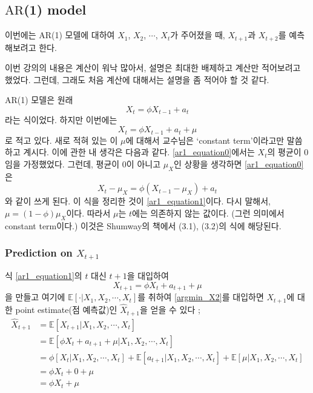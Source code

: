 \documentclass{article}
\newcommand\ar{\ensuremath{\text{AR}}}
\begin{document}
\subsection{\ar(1) model}
이번에는 \ar(1) 모델에 대하여 \(X_1\), \(X_2\), \(\cdots\), \(X_t\)가 주어졌을 때, \(X_{t+1}\)과 \(X_{t+2}\)를 예측해보려고 한다.

이번 강의의 내용은 계산이 워낙 많아서, 설명은 최대한 배제하고 계산만 적어보려고 했었다.
그런데, 그래도 처음 계산에 대해서는 설명을 좀 적어야 할 것 같다.

\ar(1) 모델은 원래
\begin{equation}\label{ar1_equation0}
X_t=\phi X_{t-1}+a_t
\end{equation}
라는 식이었다.
하지만 이번에는
\begin{equation}\label{ar1_equation1}
X_t=\phi X_{t-1}+a_t+\mu
\end{equation}
로 적고 있다.
새로 적혀 있는 이 \(\mu\)에 대해서 교수님은 `constant term'이라고만 말씀하고 계시다.
이에 관한 내 생각은 다음과 같다.
\eqref{ar1_equation0}에서는 \(X_t\)의 평균이 0임을 가정했었다.
그런데, 평균이 0이 아니고 \(\mu_X\)인 상황을 생각하면
\eqref{ar1_equation0}은
\[X_t-\mu_X=\phi(X_{t-1}-\mu_X)+a_t\]
와 같이 쓰게 된다.
이 식을 정리한 것이 \eqref{ar1_equation1}이다.
다시 말해서, \(\mu=(1-\phi)\mu_X\)이다.
따라서 \(\mu\)는 \(t\)에는 의존하지 않는 값이다.
(그런 의미에서 constant term이다.)
이것은 Shumway의 책에서 (3.1), (3.2)의 식에 해당된다.

%
\subsubsection{Prediction on \(X_{t+1}\)}
식 \eqref{ar1_equation1}의 \(t\) 대신 \(t+1\)을 대입하여
\begin{equation}\label{ar1_equation2}
X_{t+1}=\phi X_t+a_{t+1}+\mu
\end{equation}
을 만들고 여기에 \(\mathbb E[\cdot|X_1,X_2,\cdots,X_t]\)를 취하여 \eqref{argmin_X2}를 대입하면 \(X_{t+1}\)에 대한 point estimate(점 예측값)인 \(\hat X_{t+1}\)을 얻을 수 있다 ;
\begin{equation}\label{ar1_equation3}
\begin{aligned}
\hat X_{t+1}
&=\mathbb E\left[X_{t+1}|X_1,X_2,\cdots,X_t\right]\\
&=\mathbb E\left[\phi X_t+a_{t+1}+\mu|X_1,X_2,\cdots,X_t\right]\\
&=\phi\left[X_t|X_1,X_2,\cdots,X_t\right]+\mathbb E\left[a_{t+1}|X_1,X_2,\cdots,X_t\right]+
\mathbb E\left[\mu|X_1,X_2,\cdots,X_t\right]\\
&=\phi X_t+0+\mu\\
&=\phi X_t+\mu
\end{aligned}
\end{equation}
\end{document}

